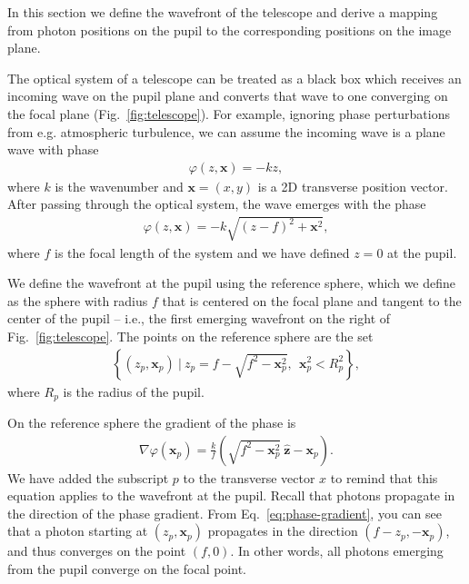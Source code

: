 \documentclass[TS,authoryear,toc]{lsstdoc}
\begin{document}
In this section we define the wavefront of the telescope and derive a mapping from photon positions on the pupil to the corresponding positions on the image plane.

The optical system of a telescope can be treated as a black box which receives an incoming wave on the pupil plane and converts that wave to one converging on the focal plane (Fig.~\ref{fig:telescope}).
For example, ignoring phase perturbations from e.g. atmospheric turbulence, we can assume the incoming wave is a plane wave with phase
\begin{align}
    \varphi(z, \mathbf{x}) = -k z,
\end{align}
where $k$ is the wavenumber and $\mathbf{x} = (x, y)$ is a 2D transverse position vector.
After passing through the optical system, the wave emerges with the phase
\begin{align}
    \varphi(z, \mathbf{x}) = -k \sqrt{(z - f)^2 + \mathbf{x}^2},
\end{align}
where $f$ is the focal length of the system and we have defined $z=0$ at the pupil.

We define the wavefront at the pupil using the reference sphere, which we define as the sphere with radius $f$ that is centered on the focal plane and tangent to the center of the pupil -- i.e., the first emerging wavefront on the right of Fig.~\ref{fig:telescope}.
The points on the reference sphere are the set
\begin{align}
  \left\{ 
    (z_p, \mathbf{x}_p) ~ \vert ~
    z_p = f - \sqrt{f^2 - \mathbf{x}_p^2}, ~~
    \mathbf{x}_p^2 < R_p^2
  \right\},
\end{align}
where $R_p$ is the radius of the pupil.

On the reference sphere the gradient of the phase is
\begin{align}
    \nabla \varphi(\mathbf{x}_p)
    = \frac{k}{f} \left( \sqrt{f^2 - \mathbf{x}_p^2} ~ \hat{\mathbf{z}} -\mathbf{x}_p \right).
    \label{eq:phase-gradient}
\end{align}
We have added the subscript $p$ to the transverse vector $x$ to remind that this equation applies to the wavefront at the pupil.
Recall that photons propagate in the direction of the phase gradient.
From Eq.~\ref{eq:phase-gradient}, you can see that a photon starting at $(z_p, \mathbf{x}_p)$ propagates in the direction $(f - z_p, -\mathbf{x}_p)$, and thus converges on the point $(f, 0)$.
In other words, all photons emerging from the pupil converge on the focal point.
\end{document}

